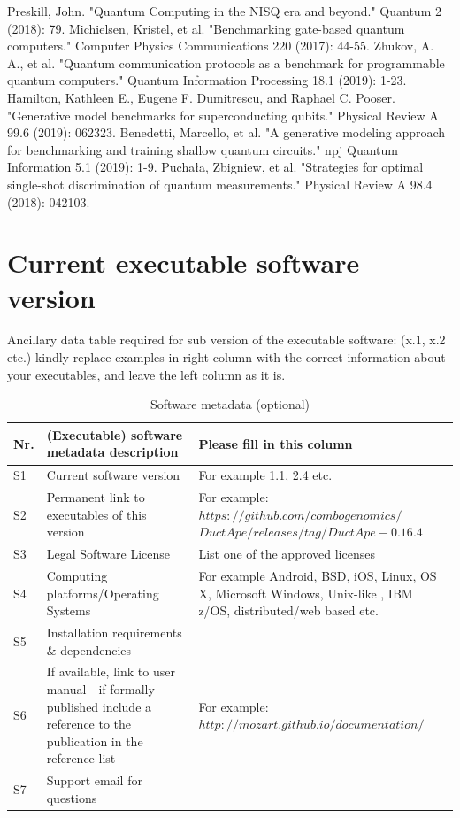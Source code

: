 \documentclass[preprint,12pt, a4paper]{elsarticle}
\newcommand{\1}{{\rm 1\hspace{-0.9mm}l}}
\begin{document}
\begin{thebibliography}{00}

 Preskill, John. "Quantum Computing in the NISQ era and beyond." Quantum 2 (2018): 79.
 Michielsen, Kristel, et al. "Benchmarking gate-based quantum computers." Computer Physics Communications 220 (2017): 44-55.
 Zhukov, A. A., et al. "Quantum communication protocols as a benchmark for programmable quantum computers." Quantum Information Processing 18.1 (2019): 1-23.
 Hamilton, Kathleen E., Eugene F. Dumitrescu, and Raphael C. Pooser. "Generative model benchmarks for superconducting qubits." Physical Review A 99.6 (2019): 062323.
 Benedetti, Marcello, et al. "A generative modeling approach for benchmarking and training shallow quantum circuits." npj Quantum Information 5.1 (2019): 1-9.
 Puchała, Zbigniew, et al. "Strategies for optimal single-shot discrimination of quantum measurements." Physical Review A 98.4 (2018): 042103.
\end{thebibliography}

\section*{Current executable software version}
\label{}

Ancillary data table required for sub version of the executable software: (x.1, x.2 etc.) kindly replace examples in right column with the correct information about your executables, and leave the left column as it is.

\begin{table}[!h]
\begin{tabular}{|l|p{6.5cm}|p{6.5cm}|}
\hline
\textbf{Nr.} & \textbf{(Executable) software metadata description} & \textbf{Please fill in this column} \\
\hline
S1 & Current software version & For example 1.1, 2.4 etc. \\
\hline
S2 & Permanent link to executables of this version  & For example: $https://github.com/combogenomics/$ $DuctApe/releases/tag/DuctApe-0.16.4$ \\
\hline
S3 & Legal Software License & List one of the approved licenses \\
\hline
S4 & Computing platforms/Operating Systems & For example Android, BSD, iOS, Linux, OS X, Microsoft Windows, Unix-like , IBM z/OS, distributed/web based etc. \\
\hline
S5 & Installation requirements \& dependencies & \\
\hline
S6 & If available, link to user manual - if formally published include a reference to the publication in the reference list & For example: $http://mozart.github.io/documentation/$ \\
\hline
S7 & Support email for questions & \\
\hline
\end{tabular}
\caption{Software metadata (optional)}
\label{} 
\end{table}
\end{document}
